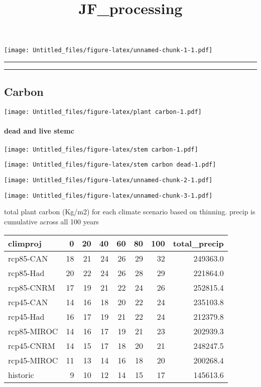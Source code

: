 \documentclass[]{article}
\title{JF\_processing}
\author{}
\date{}
\let\oldparagraph\paragraph
\renewcommand{\paragraph}[1]{\oldparagraph{#1}\mbox{}}
\begin{document}
\maketitle

\texttt{[image: Untitled\_files/figure-latex/unnamed-chunk-1-1.pdf]}

\begin{center}\rule{0.5\linewidth}{\linethickness}\end{center}

\begin{center}\rule{0.5\linewidth}{\linethickness}\end{center}

\subsection{Carbon}\label{carbon}

\texttt{[image: Untitled\_files/figure-latex/plant carbon-1.pdf]}

\paragraph{dead and live stemc}\label{dead-and-live-stemc}

\texttt{[image: Untitled\_files/figure-latex/stem carbon-1.pdf]}

\texttt{[image: Untitled\_files/figure-latex/stem carbon dead-1.pdf]}

\texttt{[image: Untitled\_files/figure-latex/unnamed-chunk-2-1.pdf]}

\texttt{[image: Untitled\_files/figure-latex/unnamed-chunk-3-1.pdf]}

total plant carbon (Kg/m2) for each climate scenario based on thinning.
precip is cumulative across all 100 years

\begin{table}[H]
\centering
\begin{tabular}{l|r|r|r|r|r|r|r}
\hline
climproj & 0 & 20 & 40 & 60 & 80 & 100 & total\_precip\\
\hline
rcp85-CAN & 18 & 21 & 24 & 26 & 29 & 32 & 249363.0\\
\hline
rcp85-Had & 20 & 22 & 24 & 26 & 28 & 29 & 221864.0\\
\hline
rcp85-CNRM & 17 & 19 & 21 & 22 & 24 & 26 & 252815.4\\
\hline
rcp45-CAN & 14 & 16 & 18 & 20 & 22 & 24 & 235103.8\\
\hline
rcp45-Had & 16 & 17 & 19 & 21 & 22 & 24 & 212379.8\\
\hline
rcp85-MIROC & 14 & 16 & 17 & 19 & 21 & 23 & 202939.3\\
\hline
rcp45-CNRM & 14 & 15 & 17 & 18 & 20 & 21 & 248247.5\\
\hline
rcp45-MIROC & 11 & 13 & 14 & 16 & 18 & 20 & 200268.4\\
\hline
historic & 9 & 10 & 12 & 14 & 15 & 17 & 145613.6\\
\hline
\end{tabular}
\end{table}
\end{document}
